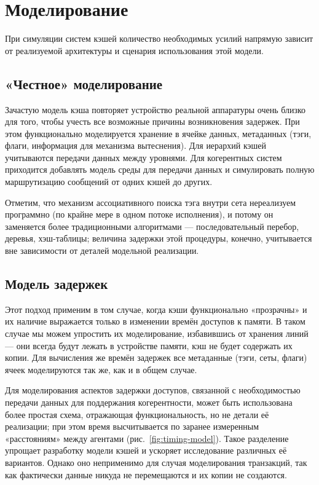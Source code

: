 \section{Моделирование}

При симуляции систем кэшей количество необходимых усилий напрямую зависит от реализуемой архитектуры и сценария использования этой модели.

\subsection{«Честное» моделирование}

Зачастую модель кэша повторяет устройство реальной аппаратуры очень близко для того, чтобы учесть все возможные причины возникновения задержек. При этом функционально моделируется хранение в ячейке данных, метаданных (тэги, флаги, информация для механизма вытеснения). Для иерархий кэшей учитываются передачи данных между уровнями. Для когерентных систем приходится добавлять модель среды для передачи данных и симулировать полную маршрутизацию сообщений от одних кэшей до других.

Отметим, что механизм ассоциативного поиска тэга внутри сета нереализуем программно (по крайне мере в одном потоке исполнения), и потому он заменяется более традиционными алгоритмами --- последовательный перебор, деревья, хэш-таблицы; величина задержки этой процедуры, конечно, учитывается вне зависимости от деталей модельной реализации.

\subsection{Модель задержек}

Этот подход применим в том случае, когда кэши функционально «прозрачны» и их наличие выражается только в изменении времён доступов к памяти. В таком случае мы можем упростить их моделирование,  избавившись от хранения линий --- они всегда будут лежать в устройстве памяти, кэш не будет содержать их копии. Для вычисления же времён задержек все метаданные (тэги, сеты, флаги) ячеек моделируются так же, как и в общем случае.

Для моделирования аспектов задержки доступов, связанной с необходимостью передачи данных для поддержания когерентности, может быть использована более простая схема, отражающая функциональность, но не детали её реализации; при этом время высчитывается по заранее измеренным «расстояниям» между агентами (рис.~\ref{fig:timing-model}). Такое разделение упрощает разработку модели кэшей и ускоряет исследование различных её вариантов. Однако оно неприменимо для случая моделирования транзакций, так как фактически данные никуда не перемещаются и их копии не создаются.

